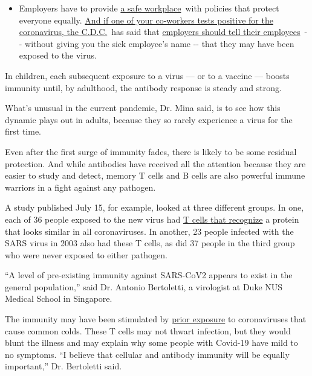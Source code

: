 \begin{itemize}
  \begin{itemize}
  \tightlist
  \item
    Employers have to provide
    \href{https://www.osha.gov/SLTC/covid-19/standards.html}{a safe
    workplace}~with policies that protect everyone equally.
    \href{https://www.nytimes3xbfgragh.onion/article/coronavirus-money-unemployment.html?action=click\&pgtype=Article\&state=default\&region=MAIN_CONTENT_3\&context=storylines_faq}{And
    if one of your co-workers tests positive for the coronavirus, the
    C.D.C.}~has said that
    \href{https://www.cdc.gov/coronavirus/2019-ncov/community/guidance-business-response.html}{employers
    should tell their employees}~-\/- without giving you the sick
    employee's name -\/- that they may have been exposed to the virus.
  \end{itemize}
\end{itemize}

In children, each subsequent exposure to a virus --- or to a vaccine ---
boosts immunity until, by adulthood, the antibody response is steady and
strong.

What's unusual in the current pandemic, Dr. Mina said, is to see how
this dynamic plays out in adults, because they so rarely experience a
virus for the first time.

Even after the first surge of immunity fades, there is likely to be some
residual protection. And while antibodies have received all the
attention because they are easier to study and detect, memory T cells
and B cells are also powerful immune warriors in a fight against any
pathogen.

A study published July 15, for example, looked at three different
groups. In one, each of 36 people exposed to the new virus had
\href{https://www.nature.com/articles/s41586-020-2550-z}{T cells that
recognize} a protein that looks similar in all coronaviruses. In
another, 23 people infected with the SARS virus in 2003 also had these T
cells, as did 37 people in the third group who were never exposed to
either pathogen.

``A level of pre-existing immunity against SARS-CoV2 appears to exist in
the general population,'' said Dr. Antonio Bertoletti, a virologist at
Duke NUS Medical School in Singapore.

The immunity may have been stimulated by
\href{https://immunology.sciencemag.org/content/5/48/eabd2071}{prior
exposure} to coronaviruses that cause common colds. These T cells may
not thwart infection, but they would blunt the illness and may explain
why some people with Covid-19 have mild to no symptoms. ``I believe that
cellular and antibody immunity will be equally important,'' Dr.
Bertoletti said.

